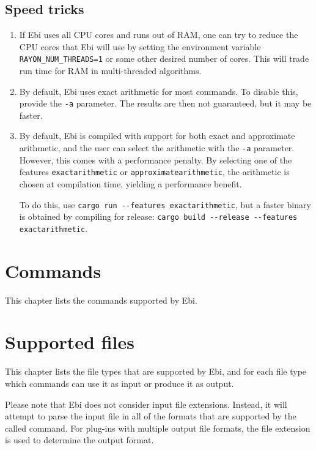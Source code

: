 \documentclass{book}
\begin{document}
	\section{Speed tricks}
	\label{sec:speedtricks}
		\begin{enumerate}
			\item
			\label{speedtrick:multithreaded}
			If Ebi uses all CPU cores and runs out of RAM, one can try to reduce the CPU cores that Ebi will use by setting the environment variable \verb!RAYON_NUM_THREADS=1! or some other desired number of cores.
			This will trade run time for RAM in multi-threaded algorithms.

			\item By default, Ebi uses exact arithmetic for most commands.
			To disable this, provide the \verb=-a= parameter.
			The results are then not guaranteed, but it may be faster.

   			\item By default, Ebi is compiled with support for both exact and approximate arithmetic, and the user can select the arithmetic with the \verb=-a= parameter.
            However, this comes with a performance penalty.
            By selecting one of the features \verb=exactarithmetic= or \verb=approximatearithmetic=, the arithmetic is chosen at compilation time, yielding a performance benefit.

            To do this, use \verb=cargo run --features exactarithmetic=, but a faster binary is obtained by compiling for release: \verb=cargo build --release --features exactarithmetic=.
		\end{enumerate}

\chapter{Commands}
\label{sec:commands}

	This chapter lists the commands supported by Ebi.

    \ebicommands

\chapter{Supported files}
\label{sec:filehandlers}
	This chapter lists the file types that are supported by Ebi, and for each file type which commands can use it as input or produce it as output.
	
    Please note that Ebi does not consider input file extensions.
    Instead, it will attempt to parse the input file in all of the formats that are supported by the called command.
    For plug-ins with multiple output file formats, the file extension is used to determine the output format.
    
\end{document}
